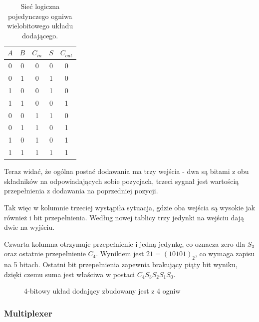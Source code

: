 \documentclass[a4paper,12pt]{article}
\begin{document}
\begin{table}[h!]
\centering

\begin{minipage}{5.5cm}
\centering

\begin{tabular}{ | c | c | c || c | c | }
  \hline
  $A$ & $B$ & $C_{in}$ & $S$ & $C_{out}$ \\ \hline
  0 & 0 & 0 & 0 & 0 \\
  0 & 1 & 0 & 1 & 0 \\
  1 & 0 & 0 & 1 & 0 \\
  1 & 1 & 0 & 0 & 1 \\
  0 & 0 & 1 & 1 & 0 \\
  0 & 1 & 1 & 0 & 1 \\
  1 & 0 & 1 & 0 & 1 \\
  1 & 1 & 1 & 1 & 1 \\
  \hline
\end{tabular}
\end{minipage}
\begin{minipage}{11cm}
   \centering
   
   \caption*{Sieć logiczna pojedynczego ogniwa wielobitowego układu dodającego.}
\end{minipage}
\end{table}

Teraz widać, że ogólna postać dodawania ma trzy wejścia - dwa są bitami z obu składników na odpowiadających sobie pozycjach, trzeci sygnał jest wartością przepełnienia z dodawania na poprzedniej pozycji.

Tak więc w kolumnie trzeciej wystąpiła sytuacja, gdzie oba wejścia są wysokie jak również i bit przepełnienia. Według nowej tablicy trzy jedynki na wejściu dają dwie na wyjściu.

Czwarta kolumna otrzymuje przepełnienie i jedną jedynkę, co oznacza zero dla $S_3$ oraz ostatnie przepełnienie $C_4$. Wynikiem jest $21 = (10101)_2$, co wymaga zapisu na 5 bitach. Ostatni bit przepełnienia zapewnia brakujący piąty bit wyniku, dzięki czemu suma jest właściwa w postaci $C_4 S_3 S_2 S_1 S_0$.

\begin{figure}[htb]
   \centering
   
   \caption*{4-bitowy układ dodający zbudowany jest z 4 ogniw}
\end{figure}


\subsubsection{Multiplexer}
\end{document}
